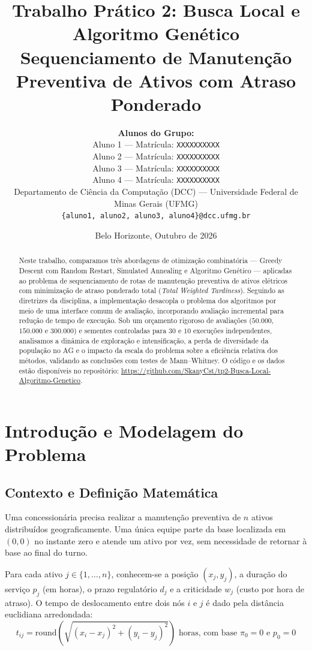 \documentclass[11pt,a4paper]{article}
\title{\textbf{Trabalho Prático 2: Busca Local e Algoritmo Genético}\\\large Sequenciamento de Manutenção Preventiva de Ativos com Atraso Ponderado}
\author{
  \textbf{Alunos do Grupo:} \\[0.4em]
  Aluno 1 --- Matrícula: \texttt{XXXXXXXXXX} \\
  Aluno 2 --- Matrícula: \texttt{XXXXXXXXXX} \\
  Aluno 3 --- Matrícula: \texttt{XXXXXXXXXX} \\
  Aluno 4 --- Matrícula: \texttt{XXXXXXXXXX} \\[0.6em]
  \small Departamento de Ciência da Computação (DCC) --- Universidade Federal de Minas Gerais (UFMG) \\
  \small \texttt{\{aluno1, aluno2, aluno3, aluno4\}@dcc.ufmg.br}
}
\date{Belo Horizonte, Outubro de 2026}
\begin{document}
\maketitle

\begin{abstract}
Neste trabalho, comparamos três abordagens de otimização combinatória --- Greedy Descent com Random Restart, Simulated Annealing e Algoritmo Genético --- aplicadas ao problema de sequenciamento de rotas de manutenção preventiva de ativos elétricos com minimização de atraso ponderado total (\textit{Total Weighted Tardiness}). Seguindo as diretrizes da disciplina, a implementação desacopla o problema dos algoritmos por meio de uma interface comum de avaliação, incorporando avaliação incremental para redução de tempo de execução. Sob um orçamento rigoroso de avaliações ($50.000$, $150.000$ e $300.000$) e sementes controladas para $30$ e $10$ execuções independentes, analisamos a dinâmica de exploração e intensificação, a perda de diversidade da população no AG e o impacto da escala do problema sobre a eficiência relativa dos métodos, validando as conclusões com testes de Mann--Whitney. O código e os dados estão disponíveis no repositório: \url{https://github.com/SkanyCst/tp2-Busca-Local-Algoritmo-Genetico}.
\end{abstract}

\section{Introdução e Modelagem do Problema}

\subsection{Contexto e Definição Matemática}
Uma concessionária precisa realizar a manutenção preventiva de $n$ ativos distribuídos geograficamente. Uma única equipe parte da base localizada em $(0,0)$ no instante zero e atende um ativo por vez, sem necessidade de retornar à base ao final do turno.

Para cada ativo $j \in \{1, \dots, n\}$, conhecem-se a posição $(x_j, y_j)$, a duração do serviço $p_j$ (em horas), o prazo regulatório $d_j$ e a criticidade $w_j$ (custo por hora de atraso). O tempo de deslocamento entre dois nós $i$ e $j$ é dado pela distância euclidiana arredondada:
\begin{equation}
t_{ij} = \mathrm{round}\left(\sqrt{(x_i - x_j)^2 + (y_i - y_j)^2}\right) \text{ horas, com base } \pi_0 = 0 \text{ e } p_0 = 0
\end{equation}
\end{document}
